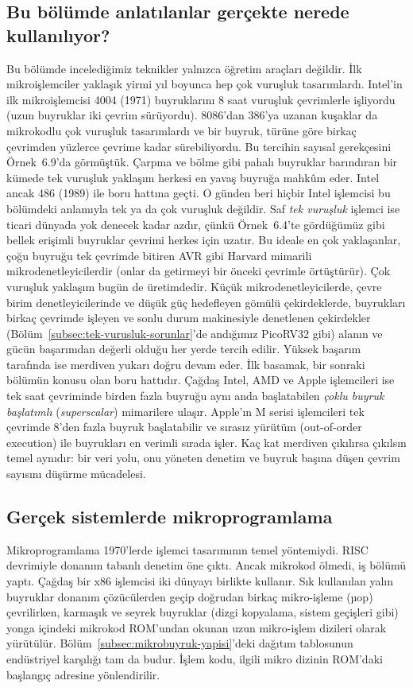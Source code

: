\subsection{Bu bölümde anlatılanlar gerçekte nerede kullanılıyor?}
Bu bölümde incelediğimiz teknikler yalnızca öğretim araçları değildir. İlk mikroişlemciler yaklaşık yirmi yıl boyunca hep çok vuruşluk tasarımlardı. Intel'in ilk mikroişlemcisi 4004 (1971) buyruklarını 8 saat vuruşluk çevrimlerle işliyordu (uzun buyruklar iki çevrim sürüyordu). 8086'dan 386'ya uzanan kuşaklar da mikrokodlu çok vuruşluk tasarımlardı ve bir buyruk, türüne göre birkaç çevrimden yüzlerce çevrime kadar sürebiliyordu. Bu tercihin sayısal gerekçesini Örnek~6.9'da görmüştük. Çarpma ve bölme gibi pahalı buyruklar barındıran bir kümede tek vuruşluk yaklaşım herkesi en yavaş buyruğa mahkûm eder. Intel ancak 486 (1989) ile boru hattına geçti. O günden beri hiçbir Intel işlemcisi bu bölümdeki anlamıyla tek ya da çok vuruşluk değildir. Saf \emph{tek vuruşluk} işlemci ise ticari dünyada yok denecek kadar azdır, çünkü Örnek~6.4'te gördüğümüz gibi bellek erişimli buyruklar çevrimi herkes için uzatır. Bu ideale en çok yaklaşanlar, çoğu buyruğu tek çevrimde bitiren AVR gibi Harvard mimarili mikrodenetleyicilerdir (onlar da getirmeyi bir önceki çevrimle örtüştürür). Çok vuruşluk yaklaşım bugün de üretimdedir. Küçük mikrodenetleyicilerde, çevre birim denetleyicilerinde ve düşük güç hedefleyen gömülü çekirdeklerde, buyrukları birkaç çevrimde işleyen ve sonlu durum makinesiyle denetlenen çekirdekler (Bölüm~\ref{subsec:tek-vurusluk-sorunlar}'de andığımız PicoRV32 gibi) alanın ve gücün başarımdan değerli olduğu her yerde tercih edilir. Yüksek başarım tarafında ise merdiven yukarı doğru devam eder. İlk basamak, bir sonraki bölümün konusu olan boru hattıdır. Çağdaş Intel, AMD ve Apple işlemcileri ise tek saat çevriminde birden fazla buyruğu aynı anda başlatabilen \emph{çoklu buyruk başlatımlı} (\emph{superscalar}) mimarilere ulaşır. Apple'ın M serisi işlemcileri tek çevrimde 8'den fazla buyruk başlatabilir ve sırasız yürütüm (out-of-order execution) ile buyrukları en verimli sırada işler. Kaç kat merdiven çıkılırsa çıkılsın temel aynıdır: bir veri yolu, onu yöneten denetim ve buyruk başına düşen çevrim sayısını düşürme mücadelesi.

\subsection{Gerçek sistemlerde mikroprogramlama}
Mikroprogramlama 1970'lerde işlemci tasarımının temel yöntemiydi. RISC devrimiyle donanım tabanlı denetim öne çıktı. Ancak mikrokod ölmedi, iş bölümü yaptı. Çağdaş bir x86 işlemcisi iki dünyayı birlikte kullanır. Sık kullanılan yalın buyruklar donanım çözücülerden geçip doğrudan birkaç mikro-işleme (µop) çevrilirken, karmaşık ve seyrek buyruklar (dizgi kopyalama, sistem geçişleri gibi) yonga içindeki mikrokod ROM'undan okunan uzun mikro-işlem dizileri olarak yürütülür. Bölüm~\ref{subsec:mikrobuyruk-yapisi}'deki dağıtım tablosunun endüstriyel karşılığı tam da budur. İşlem kodu, ilgili mikro dizinin ROM'daki başlangıç adresine yönlendirilir.

